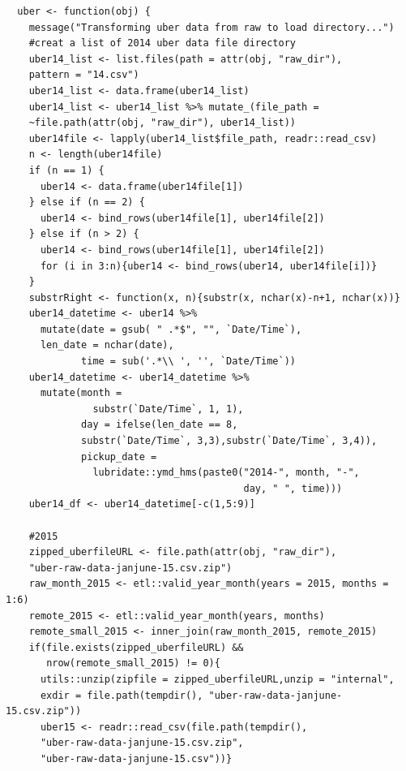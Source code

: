 \documentclass[12pt,twoside]{reedthesis}
\theoremstyle{definition}
\theoremstyle{definition}
\theoremstyle{definition}
\theoremstyle{remark}
\begin{document}
\begin{verbatim}
  uber <- function(obj) {
    message("Transforming uber data from raw to load directory...")
    #creat a list of 2014 uber data file directory
    uber14_list <- list.files(path = attr(obj, "raw_dir"), 
    pattern = "14.csv")
    uber14_list <- data.frame(uber14_list)
    uber14_list <- uber14_list %>% mutate_(file_path = 
    ~file.path(attr(obj, "raw_dir"), uber14_list))
    uber14file <- lapply(uber14_list$file_path, readr::read_csv)
    n <- length(uber14file)
    if (n == 1) {
      uber14 <- data.frame(uber14file[1])
    } else if (n == 2) {
      uber14 <- bind_rows(uber14file[1], uber14file[2])
    } else if (n > 2) {
      uber14 <- bind_rows(uber14file[1], uber14file[2])
      for (i in 3:n){uber14 <- bind_rows(uber14, uber14file[i])}
    }
    substrRight <- function(x, n){substr(x, nchar(x)-n+1, nchar(x))}
    uber14_datetime <- uber14 %>%
      mutate(date = gsub( " .*$", "", `Date/Time`), 
      len_date = nchar(date), 
             time = sub('.*\\ ', '', `Date/Time`))
    uber14_datetime <- uber14_datetime %>%
      mutate(month = 
               substr(`Date/Time`, 1, 1),
             day = ifelse(len_date == 8, 
             substr(`Date/Time`, 3,3),substr(`Date/Time`, 3,4)),
             pickup_date = 
               lubridate::ymd_hms(paste0("2014-", month, "-", 
                                         day, " ", time)))
    uber14_df <- uber14_datetime[-c(1,5:9)]
    
    #2015
    zipped_uberfileURL <- file.path(attr(obj, "raw_dir"),
    "uber-raw-data-janjune-15.csv.zip")
    raw_month_2015 <- etl::valid_year_month(years = 2015, months = 1:6)
    remote_2015 <- etl::valid_year_month(years, months)
    remote_small_2015 <- inner_join(raw_month_2015, remote_2015)
    if(file.exists(zipped_uberfileURL) && 
       nrow(remote_small_2015) != 0){
      utils::unzip(zipfile = zipped_uberfileURL,unzip = "internal",
      exdir = file.path(tempdir(), "uber-raw-data-janjune-15.csv.zip"))
      uber15 <- readr::read_csv(file.path(tempdir(),
      "uber-raw-data-janjune-15.csv.zip",
      "uber-raw-data-janjune-15.csv"))}
    

\end{verbatim}
\end{document}
